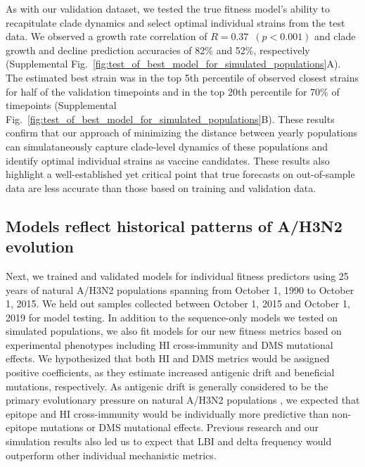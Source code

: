 As with our validation dataset, we tested the true fitness model's ability to recapitulate clade dynamics and select optimal individual strains from the test data.
We observed a growth rate correlation of $R = 0.37$~$(p < 0.001)$ and clade growth and decline prediction accuracies of 82\% and 52\%, respectively (Supplemental Fig.~\ref{fig:test_of_best_model_for_simulated_populations}A).
The estimated best strain was in the top 5th percentile of observed closest strains for half of the validation timepoints and in the top 20th percentile for 70\% of timepoints (Supplemental Fig.~\ref{fig:test_of_best_model_for_simulated_populations}B).
These results confirm that our approach of minimizing the distance between yearly populations can simulataneously capture clade-level dynamics of these populations and identify optimal individual strains as vaccine candidates.
These results also highlight a well-established yet critical point that true forecasts on out-of-sample data are less accurate than those based on training and validation data.

\subsection*{Models reflect historical patterns of A/H3N2 evolution}

Next, we trained and validated models for individual fitness predictors using 25 years of natural A/H3N2 populations spanning from October 1, 1990 to October 1, 2015.
We held out samples collected between October 1, 2015 and October 1, 2019 for model testing.
In addition to the sequence-only models we tested on simulated populations, we also fit models for our new fitness metrics based on experimental phenotypes including HI cross-immunity and DMS mutational effects.
We hypothesized that both HI and DMS metrics would be assigned positive coefficients, as they estimate increased antigenic drift and beneficial mutations, respectively.
As antigenic drift is generally considered to be the primary evolutionary pressure on natural A/H3N2 populations \cite{Smith:2004jc,Bedford:2014bf,Luksza:2014hj}, we expected that epitope and HI cross-immunity would be individually more predictive than non-epitope mutations or DMS mutational effects.
Previous research \cite{Neher:2016hy} and our simulation results also led us to expect that LBI and delta frequency would outperform other individual mechanistic metrics.

